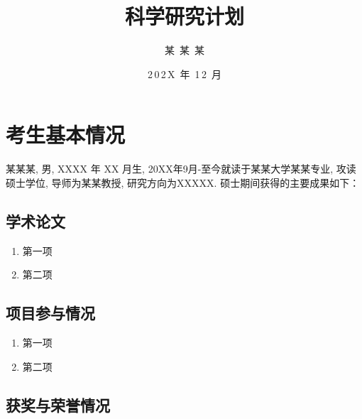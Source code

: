 \documentclass{phdproposal}
\title{科学研究计划}
\author{某~某~某}    %
\date{2\,0\,2\,X~年~1\,2~月}  %
\begin{document}
    \frontmatter

    \maketitle

     \thispagestyle{empty}
     


    \clearpage   %
	
    \maketoc[nopagenum]


	\clearpage  %

    \mainmatter



\chapter{考生基本情况}

某某某, 男, XXXX 年 XX 月生, 20XX年9月-至今就读于某某大学某某专业, 攻读硕士学位, 导师为某某教授, 研究方向为XXXXX. 硕士期间获得的主要成果如下：


\section{学术论文}

\begin{enumerate}[label=(\arabic*)]
	\item 第一项
	\item 第二项
\end{enumerate}

\section{项目参与情况}

\begin{enumerate}[label=(\arabic*)]
	\item 第一项
	\item 第二项
\end{enumerate}

\section{获奖与荣誉情况}
\end{document}
